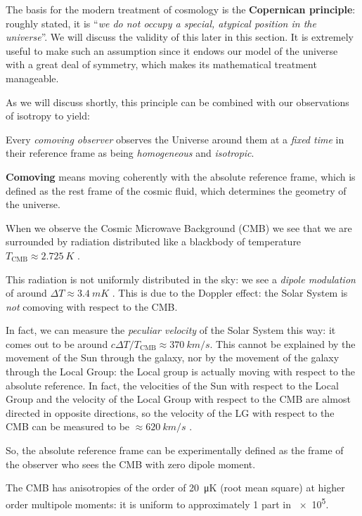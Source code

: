 \documentclass[main.tex]{subfiles}
\begin{document}
The basis for the modern treatment of cosmology is the \textbf{Copernican principle}:
roughly stated, it is ``\emph{we do not occupy a special, atypical position in the universe}''.
We will discuss the validity of this later in this section.
It is extremely useful to make such an assumption since it endows our model of the universe with a great deal of symmetry, which makes its mathematical treatment manageable. 

As we will discuss shortly, this principle can be combined with our observations of isotropy to yield:
%
\begin{proposition}
    Every \emph{comoving observer} observes the Universe around them at a \emph{fixed time} in their reference frame as being \emph{homogeneous} and \emph{isotropic}.
\end{proposition}

\textbf{Comoving} means moving coherently with the absolute reference frame, which is defined as the rest frame of the cosmic fluid, which determines the geometry of the universe. 

When we observe the Cosmic Microwave Background (CMB) we see that we are surrounded by radiation distributed like a blackbody of temperature \(T _{\text{CMB}} \approx \SI{2.725}{K}\) \cite[]{Fixsen:2009}.

This radiation is not uniformly distributed in the sky: we 
see a \emph{dipole modulation} of around \(\Delta T \approx\SI{3.4}{mK}\) \cite[]{PlanckCollaboration:2018I}.
This is due to the Doppler effect: the Solar System is \emph{not} comoving with respect to the CMB.

In fact, we can measure the \emph{peculiar velocity} of the Solar System this way: it comes out to be around \(c \Delta T / T _{\text{CMB}} \approx \SI{370}{km/s}\).
This cannot be explained by the movement of the Sun through the galaxy, nor by the movement of the galaxy through the Local Group: the Local group is actually moving with respect to the absolute reference.
In fact, the velocities of the Sun with respect to the Local Group and the velocity of the Local Group with respect to the CMB are almost directed in opposite directions, so the velocity of the LG with respect to the CMB can be measured to be \(\approx \SI{620}{km/s}\) \cite[Table 3]{PlanckCollaboration:2018I}.

So, the absolute reference frame can be experimentally defined as the frame of the observer who sees the CMB with zero dipole moment.

The CMB has anisotropies of the order of \SI{20}{\micro K} (root mean square) \cite[]{Wright:2003} at higher order multipole moments: it is uniform to approximately 1 part in \num{e5}.
\end{document}
